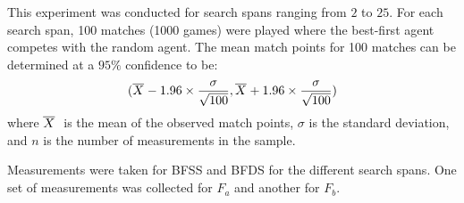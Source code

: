 This experiment was conducted for search spans ranging from $2$ to $25$.  For each search span, 100 matches (1000 games) were played where the best-first agent competes with the random agent.  The mean match points for 100 matches can be determined at a $95\%$ confidence to be:
\begin{equation}
(\overline{X}_{\mbox{\tiny }} - 1.96 \times \frac{\sigma} {\sqrt{100}},
\overline{X}_{\mbox{\tiny }} + 1.96 \times \frac{\sigma}{\sqrt{100}})
\label{eq:tree-conf95_100}
\end{equation} 
where  $\overline{X}_{\mbox{\tiny \ }}$ is the mean of the observed match points, $\sigma$ is the standard deviation, and $n$ is the number of measurements in the sample.    

Measurements were taken for BFSS and BFDS for the different search spans.  One set of measurements was collected for $F_a$ and another for $F_b$. 

